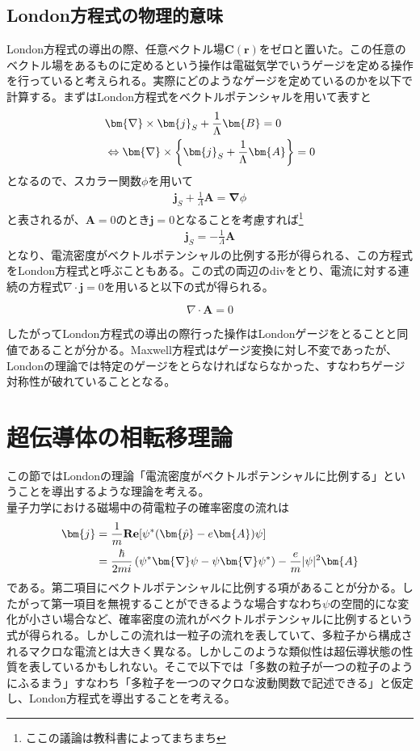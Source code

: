 \documentclass[dvipdfmx, 11pt, a4paper]{jsarticle}
\numberwithin{equation}{section}
\theoremstyle{definition}
\begin{document}
\subsection{London方程式の物理的意味}
    London方程式の導出の際、任意ベクトル場$\bm{C}(\bm{r})$をゼロと置いた。この任意のベクトル場をあるものに定めるという操作は電磁気学でいうゲージを定める操作を行っていると考えられる。実際にどのようなゲージを定めているのかを以下で計算する。まずはLondon方程式をベクトルポテンシャルを用いて表すと
    \begin{align}
        &\bm{\nabla} \times \bm{j}_S  + \frac{1}{\Lambda} \bm{B} = 0 \notag \\
        &\Leftrightarrow \bm{\nabla} \times \left\{ \bm{j}_S  + \frac{1}{\Lambda}  \bm{A} \right\} = 0
    \end{align}
    となるので、スカラー関数$\phi$を用いて
    \begin{align}
        \bm{j}_S  + \frac{1}{\Lambda}  \bm{A} = \bm{\nabla}\phi
    \end{align}
    と表されるが、$\bm{A} = 0$のとき$\bm{j}=0$となることを考慮すれば\footnote{ここの議論は教科書によってまちまち}
    \begin{align}
        \bm{j}_S  = -\frac{1}{\Lambda}  \bm{A}
    \end{align}
    となり、電流密度がベクトルポテンシャルの比例する形が得られる、この方程式をLondon方程式と呼ぶこともある。この式の両辺のdivをとり、電流に対する連続の方程式$\nabla \cdot \bm{j}=0$を用いると以下の式が得られる。
    \begin{definition}[Londonゲージ]
        \begin{equation}
            \nabla \cdot \bm{A} = 0
        \end{equation}
    \end{definition}
    したがってLondon方程式の導出の際行った操作はLondonゲージをとることと同値であることが分かる。Maxwell方程式はゲージ変換に対し不変であったが、Londonの理論では特定のゲージをとらなければならなかった、すなわちゲージ対称性が破れていることとなる。
\section{超伝導体の相転移理論}
    この節ではLondonの理論「電流密度がベクトルポテンシャルに比例する」ということを導出するような理論を考える。\\
    量子力学における磁場中の荷電粒子の確率密度の流れは
    \begin{align}
        \bm{j} &= \frac{1}{m}\textbf{Re}[\psi^* (\bm{\hat{p}}-e\bm{A})\psi] \notag \\
        &= \frac{\hbar}{2mi}\left( \psi^* \bm{\nabla} \psi - \psi \bm{\nabla} \psi^* \right) - \frac{e}{m}|\psi|^2 \bm{A}
    \end{align}
    である。第二項目にベクトルポテンシャルに比例する項があることが分かる。したがって第一項目を無視することができるような場合すなわち$\psi$の空間的にな変化が小さい場合など、確率密度の流れがベクトルポテンシャルに比例するという式が得られる。しかしこの流れは一粒子の流れを表していて、多粒子から構成されるマクロな電流とは大きく異なる。しかしこのような類似性は超伝導状態の性質を表しているかもしれない。そこで以下では「多数の粒子が一つの粒子のようにふるまう」すなわち「多粒子を一つのマクロな波動関数で記述できる」と仮定し、London方程式を導出することを考える。
\end{document}
